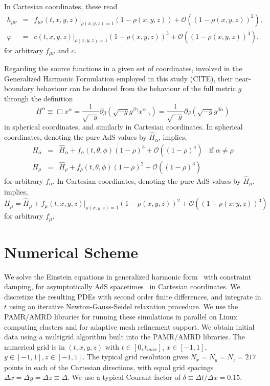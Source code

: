 \documentclass[12pt]{iopart} %
\begin{document}
In Cartesian coordinates, these read
\begin{eqnarray}
\label{eq:carbouncondh}
h_{\mu\nu}&=&f_{\mu\nu}(t,x,y,z)|_{\rho(x,y,z)=1}(1-\rho(x,y,z))+\mathcal{O}((1-\rho(x,y,z))^{2}), \\
\label{eq:carbouncondphi}
\varphi&=&c(t,x,y,z)|_{\rho(x,y,z)=1}(1-\rho(x,y,z))^3+\mathcal{O}((1-\rho(x,y,z))^{4}), 
\end{eqnarray}
for arbitrary $f_{\mu\nu}$ and $c$.

Regarding the source functions in a given set of coordinates, involved in the Generalized Harmonic Formulation employed in this study (CITE), their near-boundary behaviour can be deduced from the behaviour of the full metric $g$ through the definition 
\begin{equation}\label{eq:defsoufunsph}
H^\alpha \equiv \Box x^\alpha = \frac{1}{\sqrt{-g}}\partial_\beta (\sqrt{-g}g^{\beta\gamma}x^\alpha_{\;\;,\gamma})=\frac{1}{\sqrt{-g}}\partial_\beta (\sqrt{-g}g^{\beta\alpha})
\end{equation}
in spherical coordinates, and similarly in Cartesian coordinates. 
In spherical coordinates, denoting the pure AdS values by $\hat{H}_\alpha$,  implies,
\begin{eqnarray}\label{eq:sphbouncondsoufunc}
H_\alpha&=&\hat{H}_\alpha+f_\alpha(t,\theta,\phi)(1-\rho)^3+\mathcal{O}((1-\rho)^4) \;\; \textrm{ if $\alpha\neq\rho$} \\ \nonumber
H_\rho&=&\hat{H}_\rho+f_\rho(t,\theta,\phi)(1-\rho)^2+\mathcal{O}((1-\rho)^3)
\end{eqnarray}
for arbitrary $f_\alpha$.
In Cartesian coordinates,  denoting the pure AdS values by $\hat{H}_\mu$,  implies,
\begin{equation}\label{eq:carbouncondsoufun}
H_\mu=\hat{H}_\mu+f_\mu(t,x,y,z)|_{\rho(x,y,z)=1}(1-\rho(x,y,z))^2+\mathcal{O}((1-\rho(x,y,z))^3)
\end{equation}
for arbitrary $f_\mu$.

\section{Numerical Scheme}\label{sec:numerical_scheme}

We solve the Einstein equations in generalized harmonic form~\cite{Pretorius:2004jg} with constraint damping, for asymptotically AdS spacetimes~\cite{Bantilan:2012vu} in Cartesian coordinates.
We discretize the resulting PDEs with second order finite differences, and integrate in $t$ using an iterative Newton-Gauss-Seidel relaxation procedure. 
We use the PAMR/AMRD libraries \cite{PAMR} for running these simulations in parallel on Linux computing clusters and for adaptive mesh refinement support.
We obtain initial data using a multigrid algorithm built into the PAMR/AMRD libraries.
The numerical grid is in $(t,x,y,z)$ with $t \in [0,t_{max}]$, $x \in [-1,1]$, $y \in [-1,1], z \in [-1,1]$.
The typical grid resolution gives $N_x=N_y=N_z=217$ points in each of the Cartesian directions, with equal grid spacings $\Delta x = \Delta y = \Delta z\equiv \Delta$.
We use a typical Courant factor of $\delta \equiv \Delta t / \Delta x = 0.15$.
\end{document}

